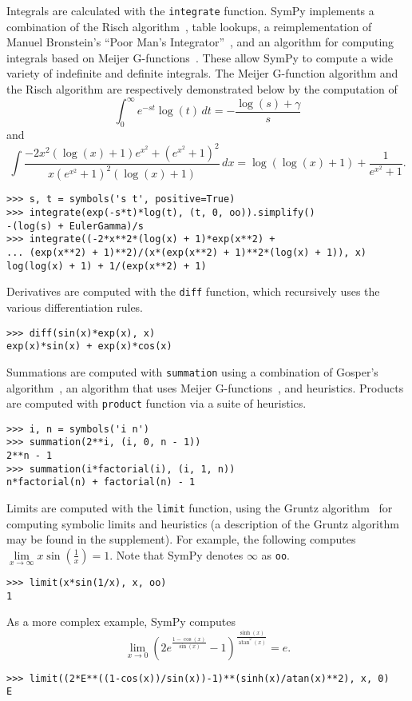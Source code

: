 Integrals are calculated with the \verb|integrate| function. SymPy
implements a combination of the Risch
algorithm~\cite{bronstein2005integration}, table lookups, a reimplementation
of Manuel Bronstein's ``Poor Man's Integrator''~\cite{Bronstein2005pmint}, and
an algorithm for computing integrals based on Meijer G-functions~\cite{Roach1996hyper,roach1997meijerg}. These allow
SymPy to compute a wide variety of indefinite and definite integrals. The
Meijer G-function algorithm and the Risch algorithm are respectively
demonstrated below by the computation of \[\int_{0}^{\infty} e^{-s t}\log{\left (t \right )}\, dt = - \frac{ \log{\left (s \right )} + \gamma}{s}\] and \[\int \frac{- 2 x^{2} \left(\log{\left (x \right )} + 1\right) e^{x^{2}} + {\left(e^{x^{2}} + 1\right)}^{2}}{x {\left(e^{x^{2}} + 1\right)}^{2} \left(\log{\left (x \right )} + 1\right)}\, dx = \log{\left (\log{\left (x \right )} + 1 \right )} + \frac{1}{e^{x^{2}} + 1}.\]
\begin{verbatim}
>>> s, t = symbols('s t', positive=True)
>>> integrate(exp(-s*t)*log(t), (t, 0, oo)).simplify()
-(log(s) + EulerGamma)/s
>>> integrate((-2*x**2*(log(x) + 1)*exp(x**2) +
... (exp(x**2) + 1)**2)/(x*(exp(x**2) + 1)**2*(log(x) + 1)), x)
log(log(x) + 1) + 1/(exp(x**2) + 1)
\end{verbatim}

Derivatives are computed with the \verb|diff| function, which recursively uses
the various differentiation rules.
\begin{verbatim}
>>> diff(sin(x)*exp(x), x)
exp(x)*sin(x) + exp(x)*cos(x)
\end{verbatim}

Summations are computed with \verb|summation|  using a combination of Gosper's
algorithm~\cite{gosper1978decision}, an algorithm that uses Meijer
G-functions~\cite{Roach1996hyper,roach1997meijerg}, and heuristics. Products
are computed with \verb|product| function via a suite of heuristics.
\begin{verbatim}
>>> i, n = symbols('i n')
>>> summation(2**i, (i, 0, n - 1))
2**n - 1
>>> summation(i*factorial(i), (i, 1, n))
n*factorial(n) + factorial(n) - 1
\end{verbatim}

Limits are computed with the \verb|limit| function, using the Gruntz
algorithm~\cite{Gruntz1996limits} for computing symbolic limits and heuristics (a description of the Gruntz algorithm may be found in the supplement).
For example, the following computes
$\lim\limits_{x\to \infty} x\sin(\frac{1}{x})=1$. Note that SymPy denotes
$\infty$ as \verb|oo|.
\begin{verbatim}
>>> limit(x*sin(1/x), x, oo)
1
\end{verbatim}
As a more complex example, SymPy computes \[\lim\limits_{x\to 0}{\left(2 e^{\frac{1 - \cos{\left (x \right )}}{\sin{\left (x \right )}}} -
  1\right)}^{\frac{\sinh{\left (x \right )}}{\operatorname{atan}^{2}{\left (x
      \right )}}} = e.\]
\begin{verbatim}
>>> limit((2*E**((1-cos(x))/sin(x))-1)**(sinh(x)/atan(x)**2), x, 0)
E
\end{verbatim}


